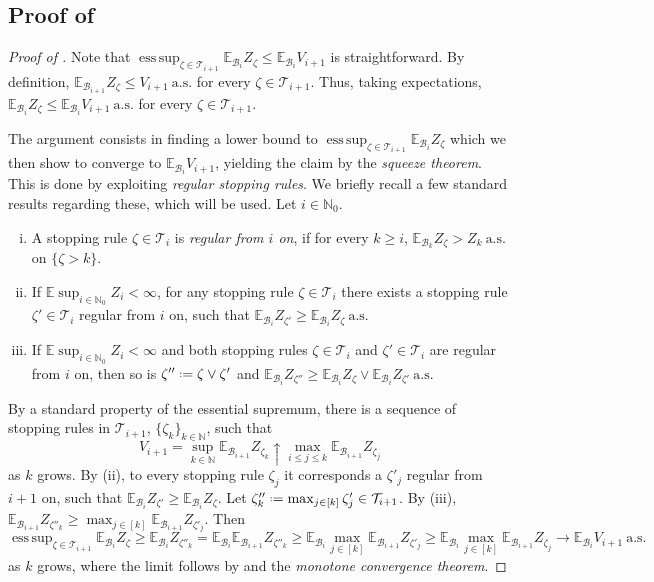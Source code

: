 \documentclass[11pt, a4paper, twoside]{article}
\newcommand*{\defeq}{\mathrel{\vcenter{\baselineskip0.5ex \lineskiplimit0pt
			\hbox{\scriptsize.}\hbox{\scriptsize.}}}=}
\newcommand{\NN}{\mathbb{N}}
\newcommand{\EE}{\mathbb{E}}
\newcommand{\TT}{\mathcal{T}}
\newcommand{\DF}{\mathcal{B}}
\newcommand{\as}{\:\text{a.s.}}
\DeclareMathOperator*{\esup}{ess\,sup} \DeclareMathOperator{\supp}{supp}
\numberwithin{equation}{section}
\begin{document}
	\subsection{Proof of }
	\begin{proof}[Proof of ]
		Note that $\esup_{\zeta\in\TT_{i+1}}\EE_{\DF_i}Z_\zeta\le \EE_{\DF_i}V_{i+1}$ is straightforward. By definition, $\EE_{\DF_{i+1}}Z_\zeta\le V_{i+1} \as$ for every $\zeta\in\TT_{i+1}$. Thus, taking expectations, $\EE_{\DF_{i}}Z_\zeta\le \EE_{\DF_{i}}V_{i+1} \as$ for every $\zeta\in\TT_{i+1}$.
		
		The argument consists in finding a lower bound to $\esup_{\zeta\in\TT_{i+1}}\EE_{\DF_i}Z_\zeta$ which we then show to converge to $\EE_{\DF_i}V_{i+1}$, yielding the claim by the \textit{squeeze theorem}. This is done by exploiting \textit{regular stopping rules}. We briefly recall a few standard results regarding these, which will be used. Let $i\in\NN_0$.
		\begin{enumerate}[i), noitemsep]
			\item A stopping rule $\zeta\in\TT_i$ is \textit{regular from $i$ on}, if for every $k\ge i$, $\EE_{\DF_k}Z_\zeta>Z_k \as$ on $\{\zeta>k\}$.
			\item If $\EE\sup_{i\in\NN_0}Z_i<\infty$, for any stopping rule $\zeta\in\TT_i$ there exists a stopping rule $\zeta'\in\TT_i$ regular from $i$ on, such that $\EE_{\DF_i}Z_{\zeta'}\ge \EE_{\DF_i}Z_{\zeta} \as$
			\item If $\EE\sup_{i\in\NN_0}Z_i<\infty$ and both stopping rules $\zeta\in\TT_i$ and $\zeta'\in\TT_i$ are regular from $i$ on, then so is $\zeta''\defeq \zeta\vee\zeta'$ and $\EE_{\DF_i}Z_{\zeta''}\ge \EE_{\DF_i}Z_{\zeta}\vee\EE_{\DF_i}Z_{\zeta'} \as$
		\end{enumerate}
		By a standard property of the essential supremum, there is a sequence of stopping rules in $\TT_{i+1}$, $\{\zeta_k\}_{k\in\NN}$, such that 
		\begin{equation}\label{mon}
			V_{i+1}=\sup_{k\in\NN}\EE_{\DF_{i+1}}Z_{\zeta_k}\uparrow \max_{i\le j\le k}\EE_{\DF_{i+1}}Z_{\zeta_j}
		\end{equation} 
		as $k$ grows. By (ii), to every stopping rule $\zeta_j$ it corresponds a $\zeta'_j$ regular from $i+1$ on, such that $\EE_{\DF_i}Z_{\zeta'}\ge \EE_{\DF_i}Z_{\zeta}$. Let $\zeta''_k\defeq \max_{j\in [k]}\zeta'_j\in\TT_{i+1}$. By (iii), $\EE_{\DF_{i+1}}Z_{\zeta''_k}\ge \max_{j\in [k]}\EE_{\DF_{i+1}}Z_{\zeta'_j}$. Then 
		\[\esup_{\zeta\in\TT_{i+1}}\EE_{\DF_i}Z_\zeta\ge \EE_{\DF_i}Z_{\zeta''_k}= \EE_{\DF_i}\EE_{\DF_{i+1}}Z_{\zeta''_k}\ge \EE_{\DF_i}\max_{j\in [k]}\EE_{\DF_{i+1}}Z_{\zeta'_j}\ge\EE_{\DF_i}\max_{j\in [k]}\EE_{\DF_{i+1}}Z_{\zeta_j}\longrightarrow\EE_{\DF_i}V_{i+1} \as\]
		as $k$ grows, where the limit follows by  and the \textit{monotone convergence theorem}.
	\end{proof}
 
\end{document}
